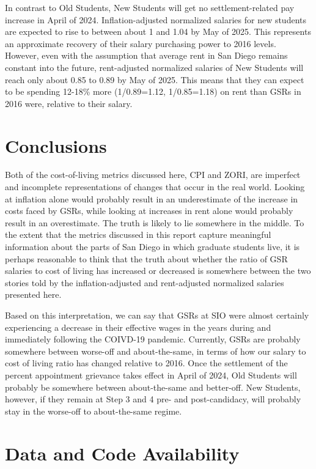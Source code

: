 \documentclass{article}
\begin{document}
In contrast to Old Students, New Students will get no settlement-related pay increase in April of 2024. Inflation-adjusted normalized salaries for new students are expected to rise to between about 1 and 1.04 by May of 2025. This represents an approximate recovery of their salary purchasing power to 2016 levels. However, even with the assumption that average rent in San Diego remains constant into the future, rent-adjusted normalized salaries of New Students will reach only about 0.85 to 0.89 by May of 2025. This means that they can expect to be spending 12-18\% more (1/0.89=1.12, 1/0.85=1.18) on rent than GSRs in 2016 were, relative to their salary.

\section{Conclusions}

Both of the cost-of-living metrics discussed here, CPI and ZORI, are imperfect and incomplete representations of changes that occur in the real world. Looking at inflation alone would probably result in an underestimate of the increase in costs faced by GSRs, while looking at increases in rent alone would probably result in an overestimate. The truth is likely to lie somewhere in the middle. To the extent that the metrics discussed in this report capture meaningful information about the parts of San Diego in which graduate students live, it is perhaps reasonable to think that the truth about whether the ratio of GSR salaries to cost of living has increased or decreased is somewhere between the two stories told by the inflation-adjusted and rent-adjusted normalized salaries presented here. 

Based on this interpretation, we can say that GSRs at SIO were almost certainly experiencing a decrease in their effective wages in the years during and immediately following the COIVD-19 pandemic. Currently, GSRs are probably somewhere between worse-off and about-the-same, in terms of how our salary to cost of living ratio has changed relative to 2016. Once the settlement of the percent appointment grievance takes effect in April of 2024, Old Students will probably be somewhere between about-the-same and better-off. New Students, however, if they remain at Step 3 and 4 pre- and post-candidacy, will probably stay in the worse-off to about-the-same regime.

\section*{Data and Code Availability}
\end{document}
